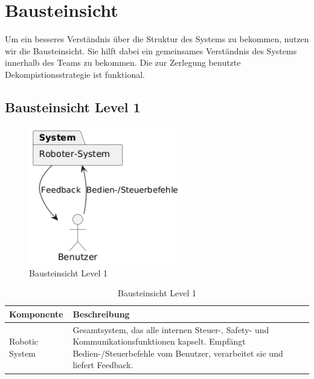 \chapter{Bausteinsicht}

Um ein besseres Verständnis über die Struktur des Systems zu bekommen, nutzen wir die Bausteinsicht. Sie hilft dabei ein gemeinsames Verständnis des Systems innerhalb des Teams zu bekommen.
Die zur Zerlegung benutzte Dekompistionsstrategie ist funktional. 

\section{Bausteinsicht Level 1}
 

\begin{figure}[h] %
    \centering
    \includegraphics[width=0.6\textwidth]{diagrams/bausteinsicht_lvl_1_system_name_change.png}
    \caption{Bausteinsicht Level 1}
\end{figure}

\begin{table}[h!]
\centering
\begin{tabular}{|p{4cm}|p{9cm}|}
\hline
\textbf{Komponente} & \textbf{Beschreibung} \\ \hline
Robotic System & Gesamtsystem, das alle internen Steuer-, Safety- und Kommunikations­funktionen kapselt. Empfängt Bedien-/Steuerbefehle vom Benutzer, verarbeitet sie und liefert Feedback. \\ \hline
\end{tabular}
\caption{Bausteinsicht Level 1}
\label{tab:lvl1}
\end{table}

\newpage
